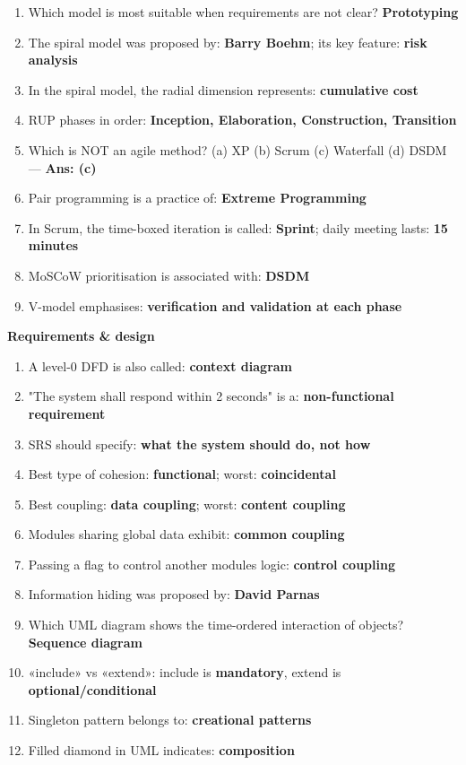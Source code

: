 \begin{enumerate}
\def\labelenumi{\arabic{enumi}.}
\tightlist
\item
  Which model is most suitable when requirements are not clear? \textbf{Prototyping}
\item
  The spiral model was proposed by: \textbf{Barry Boehm}; its key feature: \textbf{risk analysis}
\item
  In the spiral model, the radial dimension represents: \textbf{cumulative cost}
\item
  RUP phases in order: \textbf{Inception, Elaboration, Construction, Transition}
\item
  Which is NOT an agile method? (a) XP (b) Scrum (c) Waterfall (d) DSDM --- \textbf{Ans: (c)}
\item
  Pair programming is a practice of: \textbf{Extreme Programming}
\item
  In Scrum, the time-boxed iteration is called: \textbf{Sprint}; daily meeting lasts: \textbf{15 minutes}
\item
  MoSCoW prioritisation is associated with: \textbf{DSDM}
\item
  V-model emphasises: \textbf{verification and validation at each phase}
\end{enumerate}

\textbf{Requirements \& design}

\begin{enumerate}
\def\labelenumi{\arabic{enumi}.}
\setcounter{enumi}{9}
\tightlist
\item
  A level-0 DFD is also called: \textbf{context diagram}
\item
  "The system shall respond within 2 seconds" is a: \textbf{non-functional requirement}
\item
  SRS should specify: \textbf{what the system should do, not how}
\item
  Best type of cohesion: \textbf{functional}; worst: \textbf{coincidental}
\item
  Best coupling: \textbf{data coupling}; worst: \textbf{content coupling}
\item
  Modules sharing global data exhibit: \textbf{common coupling}
\item
  Passing a flag to control another module\textquotesingle s logic: \textbf{control coupling}
\item
  Information hiding was proposed by: \textbf{David Parnas}
\item
  Which UML diagram shows the time-ordered interaction of objects? \textbf{Sequence diagram}
\item
  «include» vs «extend»: include is \textbf{mandatory}, extend is \textbf{optional/conditional}
\item
  Singleton pattern belongs to: \textbf{creational patterns}
\item
  Filled diamond in UML indicates: \textbf{composition}
\end{enumerate}

